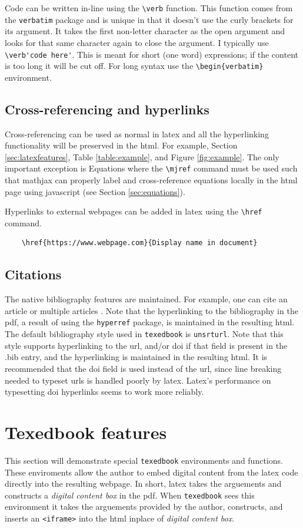 \documentclass{article}
\begin{document}
Code can be written in-line using the \verb'\verb' function. This function comes from the \verb'verbatim' package and is unique in that it doesn't use the curly brackets for its argument. It takes the first non-letter character as the open argument and looks for that same character again to close the argument. I typically use \verb_\verb'code here'_. This is meant for short (one word) expressions; if the content is too long it will be cut off. For long syntax use the \verb'\begin{verbatim}' environment.    

\subsection{Cross-referencing and hyperlinks}
Cross-referencing can be used as normal in latex and all the hyperlinking functionality will be preserved in the html. For example, Section \ref{sec:latexfeatures}, Table \ref{table:example}, and Figure \ref{fig:example}. The only important exception is Equations where the \verb'\mjref' command must be used such that mathjax can properly label and cross-reference equations locally in the html page using javascript (see Section \ref{sec:equations}).

Hyperlinks to external webpages can be added in latex using the \verb'\href' command.
\begin{verbatim}
    \href{https://www.webpage.com}{Display name in document}
\end{verbatim}

\subsection{Citations}
The native bibliography features are maintained. For example, one can cite an article \cite{Hanus2021} or multiple articles \cite{Hanus2019,Hanus2021,Gregory2021}. Note that the hyperlinking to the bibliography in the pdf, a result of using the \verb'hyperref' package, is maintained in the resulting html. The default bibliography style used in \verb'texedbook' is \verb'unsrturl'. Note that this style supports hyperlinking to the url, and/or doi if that field is present in the .bib entry, and the hyperlinking is maintained in the resulting html. It is recommended that the doi field is used instead of the url, since line breaking needed to typeset urls is handled poorly by latex. Latex's performance on typesetting doi hyperlinks seems to work more reliably.

\section{Texedbook features}
This section will demonstrate special \verb'texedbook' environments and functions. These enviroments allow the author to embed digital content from the latex code directly into the resulting webpage. In short, latex takes the arguements and constructs a \textit{digital content box} in the pdf. When \verb'texedbook' sees this environment it takes the arguements provided by the author, constructs, and inserts an \verb'<iframe>' into the html inplace of \textit{digital content box}. 
\end{document}
